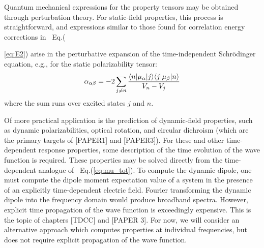 Quantum mechanical expressions for the property tensors may be obtained through perturbation theory. 
For static-field properties, this process is straightforward, and expressions similar to those found for
correlation energy corrections in ~Eq.({\ref{eq:E2}) arise in the perturbative expansion of the time-independent Schr\"odinger
equation, e.g., for the static polarizability tensor:
\begin{equation} \label{eq:static_pol}
\alpha_{\alpha\beta} = -2\sum_{j\neq n}\frac{\langle n |\mu_\alpha| j \rangle\langle j |\mu_\beta| n \rangle}{V_n - V_j} 
\end{equation}
where the sum runs over excited states $j$ and $n$.

Of more practical application is the prediction of dynamic-field properties, such as dynamic polarizabilities, 
optical rotation, and circular dichroism (which are the primary targets of [PAPER1] and [PAPER3]).
For these and other time-dependent response properties, some description of the time evolution of the wave function is
required. 
These properties may be solved directly from the time-dependent analogue of ~Eq.(\ref{eq:mu_tot}). 
To compute the dynamic dipole, one must compute the dipole moment expectation value of a system in the presence of an explicitly
time-dependent electric field.
Fourier transforming the dynamic dipole into the frequency domain would produce broadband spectra.
However, explicit time propagation of the wave function is exceedingly expensive. This is the topic of chapters [TDCC] and [PAPER 3]. 
For now, we will consider an alternative approach which computes properties at individual frequencies, 
but does not require explicit propagation of the wave function. 

}
